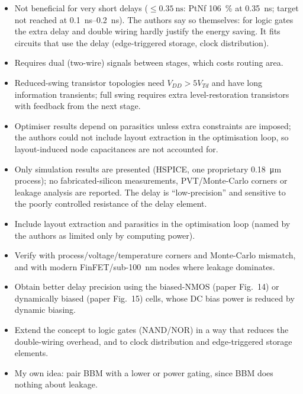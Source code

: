 \documentclass[11pt,a4paper]{article}
\begin{document}
\begin{itemize}
  \item Not beneficial for very short delays ($\leq\SI{0.35}{\nano\second}$: PtNf \SI{106}{\percent} at \SI{0.35}{\nano\second}; target not reached at \SIrange{0.1}{0.2}{\nano\second}). The authors say so themselves: for logic gates the extra delay and double wiring hardly justify the energy saving. It fits circuits that use the delay (edge-triggered storage, clock distribution).
  \item Requires dual (two-wire) signals between stages, which costs routing area.
  \item Reduced-swing transistor topologies need $V_{DD}>5V_{Td}$ and have long information transients; full swing requires extra level-restoration transistors with feedback from the next stage.
  \item Optimiser results depend on parasitics unless extra constraints are imposed; the authors could not include layout extraction in the optimisation loop, so layout-induced node capacitances are not accounted for.
  \item Only simulation results are presented (HSPICE, one proprietary \SI{0.18}{\micro\meter} process); no fabricated-silicon measurements, PVT/Monte-Carlo corners or leakage analysis are reported. The delay is ``low-precision'' and sensitive to the poorly controlled resistance of the delay element.
\end{itemize}

\begin{itemize}
  \item Include layout extraction and parasitics in the optimisation loop (named by the authors as limited only by computing power).
  \item Verify with process/voltage/temperature corners and Monte-Carlo mismatch, and with modern FinFET/sub-\SI{100}{\nano\meter} nodes where leakage dominates.
  \item Obtain better delay precision using the biased-NMOS (paper Fig.~14) or dynamically biased (paper Fig.~15) cells, whose DC bias power is reduced by dynamic biasing.
  \item Extend the concept to logic gates (NAND/NOR) in a way that reduces the double-wiring overhead, and to clock distribution and edge-triggered storage elements.
  \item My own idea: pair BBM with a lower \VDD{} or power gating, since BBM does nothing about leakage.
\end{itemize}
\end{document}
